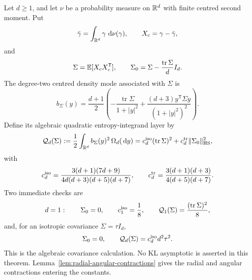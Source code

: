 \begin{theorem}%
\label{thm:multidim-covariance-algebra}
\label{prop:multidim-formal-covariance-layer}
Let \(d\ge1\), and let \(\nu\) be a probability measure on \(\mathbb{R}^d\) with
finite centred second moment.  Put
\[
\bar{\gamma}=\int_{\mathbb{R}^d}\gamma\,\,\mathrm{d}\nu(\gamma),
\qquad
X_c=\gamma-\bar{\gamma},
\]
and
\[
\Sigma=\mathbb{E}[X_cX_c^{\mathsf T}],\qquad
\Sigma_0=\Sigma-\frac{\operatorname{tr}\Sigma}{d}I_d.
\]
The degree-two centred density mode associated with \(\Sigma\) is
\begin{equation}\label{eq:multidim-leading-theorem-density-mode}
b_\Sigma(y)=
\frac{d+1}{2}\left(
-\frac{\operatorname{tr}\Sigma}{1+|y|^2}
+\frac{(d+3)y^{\mathsf T}\Sigma y}{(1+|y|^2)^2}
\right).
\end{equation}
Define its algebraic quadratic entropy-integrand layer by
\begin{equation}\label{eq:multidim-leading-positive-defect}
\mathcal Q_d(\Sigma)
:=\frac12\int_{\mathbb{R}^d}b_\Sigma(y)^2\,\Omega_d(\,\mathrm{d} y)
=c_d^{\rm iso}(\operatorname{tr}\Sigma)^2
+c_d^{\rm tr}\|\Sigma_0\|_{\rm HS}^2,
\end{equation}
with
\begin{equation}\label{eq:multidim-leading-positive-constants}
c_d^{\rm iso}=
\frac{3(d+1)(7d+9)}
{4d(d+3)(d+5)(d+7)},
\qquad
c_d^{\rm tr}=
\frac{3(d+1)(d+3)}
{4(d+5)(d+7)} .
\end{equation}
Two immediate checks are
\[
d=1:\qquad \Sigma_0=0,\qquad c_1^{\rm iso}=\frac18,\qquad
\mathcal Q_1(\Sigma)=\frac{(\operatorname{tr}\Sigma)^2}{8},
\]
and, for an isotropic covariance \(\Sigma=\tau I_d\),
\[
\Sigma_0=0,\qquad
\mathcal Q_d(\Sigma)=c_d^{\rm iso}d^2\tau^2 .
\]
This is the algebraic covariance calculation.  No KL asymptotic is asserted
in this theorem.  Lemma~\ref{lem:radial-angular-contractions} gives the radial
and angular contractions entering the constants.
\end{theorem}

